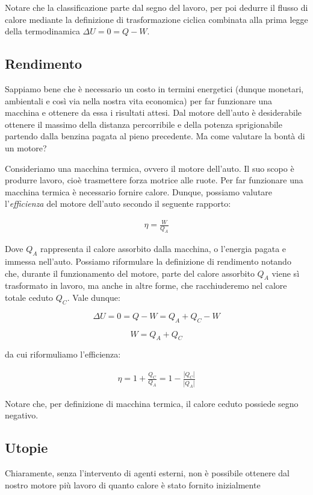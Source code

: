 Notare che la classificazione parte dal segno del lavoro, per poi
dedurre il flusso di calore mediante la definizione di trasformazione
ciclica combinata alla prima legge della termodinamica $\Delta U = 0 = Q - W$.

\subsection{Rendimento}
Sappiamo bene che è necessario un costo in termini energetici (dunque monetari,
ambientali e così via nella nostra vita economica) per far funzionare una
macchina e ottenere da essa i risultati attesi. Dal motore dell'auto è desiderabile
ottenere il massimo della distanza percorribile e della potenza sprigionabile
partendo dalla benzina pagata al pieno precedente. Ma come valutare la bontà
di un motore?

Consideriamo una macchina termica, ovvero il motore dell'auto. Il suo scopo
è produrre lavoro, cioè trasmettere forza motrice alle ruote. Per far funzionare
una macchina termica è necessario fornire calore. Dunque, possiamo valutare
l'\textit{efficienza} del motore dell'auto secondo il seguente rapporto:

\begin{align}
    \eta = \frac{W}{Q_A}
\end{align}


\noindent Dove $Q_A$ rappresenta il calore assorbito dalla macchina, o l'energia pagata
e immessa nell'auto. Possiamo riformulare la definizione di rendimento
notando che, durante il funzionamento del motore, parte del calore assorbito
$Q_A$ viene sì trasformato in lavoro, ma anche in altre forme, che racchiuderemo
nel calore totale ceduto $Q_C$. Vale dunque:

\[ \Delta U = 0 = Q - W = Q_A + Q_C - W \]

\[ W = Q_A + Q_C \]

\noindent da cui riformuliamo l'efficienza:

\begin{align}
    \eta = 1 + \frac{Q_C}{Q_A} = 1 - \frac{|Q_C|}{|Q_A|}
\end{align}

\noindent Notare che, per definizione di macchina termica, il calore
ceduto possiede segno negativo.

\subsection{Utopie}
Chiaramente, senza l'intervento di agenti esterni, non è possibile
ottenere dal nostro motore più lavoro di quanto calore è stato fornito
inizialmente

